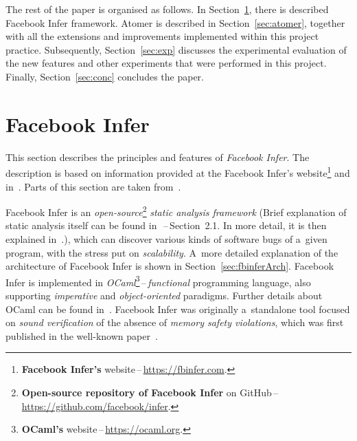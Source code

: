 The rest of the paper is organised as follows. In Section~\ref{sec:fbinfer},
there is described Facebook Infer framework. Atomer is described in
Section~\ref{sec:atomer}, together with all the extensions and improvements
implemented within this project practice. Subsequently,
Section~\ref{sec:exp} discusses the experimental evaluation of the new
features and other experiments that were performed in this project.
Finally, Section~\ref{sec:conc} concludes the paper.


\section{Facebook Infer}
\label{sec:fbinfer}

This section describes the principles and features of \emph{Facebook Infer}.
The description is based on information provided at the Facebook Infer's
website\footnote{\textbf{Facebook Infer's}
website\,--\,\url{https://fbinfer.com}.} and
in~\cite{projectPracticeMarcin2018}. Parts of this section are taken
from~\cite{harmimBP, excel2019FBInfer}.

Facebook Infer is an \emph{open-source}\footnote{\textbf{Open-source repository
of Facebook Infer} on GitHub\,--\,\url{https://github.com/facebook/infer}.}
\emph{static analysis framework} (Brief explanation of static analysis itself
can be found in~\cite{harmimBP}\,--\,Section~2.1. In more detail, it is then
explained in~\cite{staticAnalysisMoller, favStaticAnalysis}.), which can
discover various kinds of software bugs of a~given program, with the stress
put on \emph{scalability}. A~more detailed explanation of the architecture of
Facebook Infer is shown in Section~\ref{sec:fbinferArch}. Facebook Infer is
implemented in \emph{OCaml}\footnote{\textbf{OCaml's}
website\,--\,\url{https://ocaml.org}.}\,--\,\emph{functional} programming
language, also supporting \emph{imperative} and \emph{object-oriented}
paradigms. Further details about OCaml can be found in~\cite{realWorldOCaml}.
Facebook Infer was originally a~standalone tool focused on \emph{sound
verification} of the absence of \emph{memory safety violations}, which was
first published in the well-known paper~\cite{inferBiabduction}.

